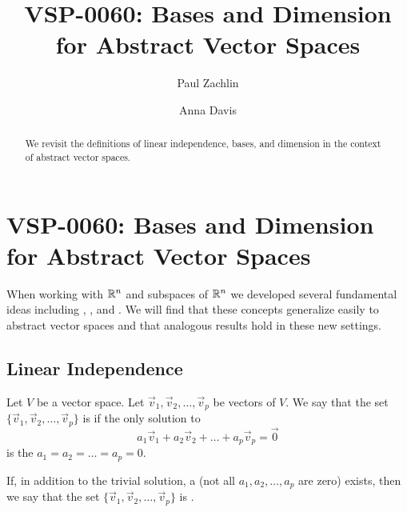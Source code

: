 \documentclass{ximera}
\author{Paul Zachlin \and Anna Davis} \title{VSP-0060: Bases and Dimension for Abstract Vector Spaces} \license{CC-BY-NC-SA}
\begin{document}
\begin{abstract}
We revisit the definitions of linear independence, bases, and dimension in the context of abstract vector spaces.
\end{abstract}
\maketitle


\section*{VSP-0060: Bases and Dimension for Abstract Vector Spaces}
When working with $\mathbb{R}^n$ and subspaces of $\mathbb{R}^n$ we developed several fundamental ideas including , ,  and .  We will find that these concepts generalize easily to abstract vector spaces and that analogous results hold in these new settings.
\subsection*{Linear Independence}
\begin{definition}\label{def:linearindependenceabstract}
Let $V$ be a vector space.  Let $\vec{v}_1, \vec{v}_2,\ldots ,\vec{v}_p$ be vectors of $V$.  We say that the set $\{\vec{v}_1, \vec{v}_2,\ldots ,\vec{v}_p\}$ is  if the only solution to 
$$a_1\vec{v}_1+a_2\vec{v}_2+\ldots +a_p\vec{v}_p=\vec{0}$$
is the  $a_1=a_2=\ldots =a_p=0$.

If, in addition to the trivial solution, a  (not all $a_1, a_2,\ldots ,a_p$ are zero) exists, then we say that the set $\{\vec{v}_1, \vec{v}_2,\ldots ,\vec{v}_p\}$ is .
\end{definition}
\end{document}
